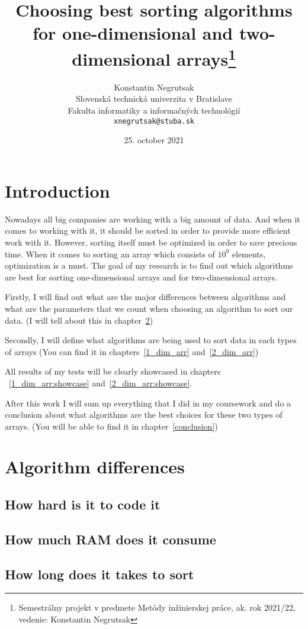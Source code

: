 \documentclass[12pt,twoside,slovak,a4paper]{article}
\title{Choosing best sorting algorithms for one-dimensional and two-dimensional arrays\thanks{Semestrálny projekt v predmete Metódy inžinierskej práce, ak. rok 2021/22, vedenie: Konstantin Negrutsak}}
\author{Konstantin Negrutsak\\[2pt]
	{\small Slovenská technická univerzita v Bratislave}\\
	{\small Fakulta informatiky a informačných technológií}\\
	{\small \texttt{xnegrutsak@stuba.sk}}
	}
\date{\small 25. october 2021}
\begin{document}
\maketitle


\section{Introduction}
Nowadays all big companies are working with a big amount of data. And when it comes to working with it, it should be sorted in order to provide more efficient work with it. However, sorting itself must be optimized in order to save precious time. When it comes to sorting an array which consists of $10^{9}$ elements, optimization is a must. The goal of my research is to find out which algorithms are best for sorting one-dimensional arrays and for two-dimensional arrays. 

Firstly, I will find out what are the major differences between algorithms and what are the parameters that we count when choosing an algorithm to sort our data. (I will tell about this in chapter~\ref{alg_diff})

Secondly, I will define what algorithms are being used to sort data in each types of arrays
(You can find it in chapters~\ref{1_dim_arr} and~\ref{2_dim_arr})

All results of my tests will be clearly showcased in chapters ~\ref{1_dim_arr:showcase} and~\ref{2_dim_arr:showcase}.

After this work I will sum up everything that I did in my coursework and do a conclusion about what algorithms are the best choices for these two types of arrays. (You will be able to find it in chapter~\ref{conclusion})


\section{Algorithm differences} \label{alg_diff}

\subsection{How hard is it to code it}
\subsection{How much RAM does it consume}
\subsection{How long does it takes to sort}
\end{document}
